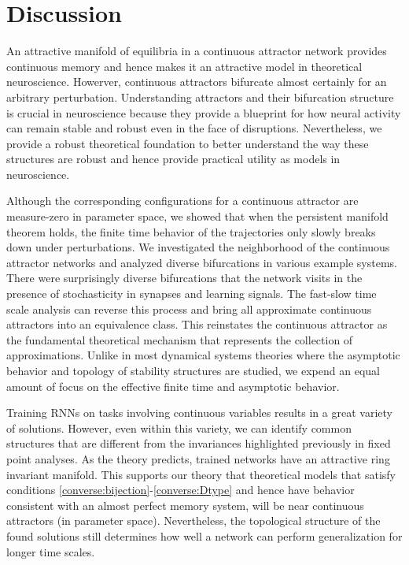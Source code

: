 \documentclass{article} %
\newcounter{ct}
\theoremstyle{definition}
\theoremstyle{remark}
\begin{document}
\section{Discussion}
An attractive manifold of equilibria in a continuous attractor network provides continuous memory and hence makes it an attractive model in theoretical neuroscience.
Howerver, continuous attractors bifurcate almost certainly for an arbitrary perturbation.
Understanding attractors and their bifurcation structure is crucial in neuroscience because they provide a blueprint for how neural activity can remain stable and robust even in the face of disruptions.
Nevertheless, we provide a robust theoretical foundation to better understand the way these structures are robust and hence provide practical utility as models in neuroscience.
 
 
Although the corresponding configurations for a continuous attractor are measure-zero in parameter space, we showed that when the persistent manifold theorem holds, the finite time behavior of the trajectories only slowly breaks down under perturbations.
We investigated the neighborhood of the continuous attractor networks and analyzed diverse bifurcations in various example systems.
There were surprisingly diverse bifurcations that the network visits in the presence of stochasticity in synapses and learning signals.
The fast-slow time scale analysis can reverse this process and bring all approximate continuous attractors into an equivalence class.
This reinstates the continuous attractor as the fundamental theoretical mechanism that represents the collection of approximations.
Unlike in most dynamical systems theories where the asymptotic behavior and topology of stability structures are studied, we expend an equal amount of focus on the effective finite time and asymptotic behavior.%

Training RNNs on tasks involving continuous variables results in a great variety of solutions.
However, even within this variety, we can identify common structures that are different from the invariances highlighted previously in fixed point analyses.
As the theory predicts, trained networks have an attractive ring invariant manifold.
This supports our theory that theoretical models that satisfy conditions \ref{converse:bijection}-\ref{converse:Dtype} and hence have behavior consistent with an almost perfect memory system, will be near continuous attractors (in parameter space).
Nevertheless, the topological structure of the found solutions still determines how well a network can perform generalization for longer time scales.
\end{document}
